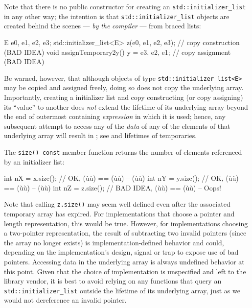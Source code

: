 \noindent Note that there is no public constructor for creating an
\lstinline!std::initializer_list! in any other way; the intention is that
\lstinline!std::initializer_list! objects are created behind the scenes
--- \emph{by} \emph{the} \emph{compiler} --- from braced lists:

\begin{emcppslisting}
E e0, e1, e2, e3;
std::initializer_list<E> z({e0, e1, e2, e3});   // copy construction (BAD IDEA)
void assignTemporary2y() { y = {e3, e2, e1}; }  // copy assignment (BAD IDEA)
\end{emcppslisting}
    

\noindent Be warned, however, that although objects of type
\lstinline!std::initializer_list<E>! may be copied and assigned freely,
doing so does not copy the underlying array. Importantly, creating a
 initializer list and copy constructing (or copy
assigning) its ``value'' to another does \emph{not} extend the lifetime
of its underlying array beyond the end of outermost containing
\emph{expression} in which it is used; hence, any subsequent attempt to
access any of the \emph{data} of any of the elements of that underlying
array will result in ; see
 and lifetimes of temporaries.

The \lstinline!size()!~\lstinline!const! member function returns the number of
elements referenced by an initializer list:

\begin{emcppslisting}
int nX = x.size();  // OK, (ù{}ù) == (ù{}ù) -- (ù{\codeincomments{\{ \}}}ù)
int nY = y.size();  // OK, (ù{}ù) == (ù{}ù) -- (ù{\codeincomments{\{ \}}}ù)
int nZ = z.size();  // BAD IDEA, (ù{}ù) == (ù{}ù) -- Oops!
\end{emcppslisting}
    

\noindent Note that calling \lstinline!z.size()! may seem well defined even after the
associated temporary array has expired. For implementations that choose
a pointer and length representation, this would be true. However, for
implementations choosing a two-pointer representation, the result of
subtracting two invalid pointers (since the array no longer exists) is
implementation-defined behavior and could, depending on the
implementation's design, signal or trap to expose use of bad pointers.
Accessing data in the underlying array is always undefined behavior at
this point. Given that the choice of implementation is unspecified and
left to the library vendor, it is best to avoid relying on any functions
that query an \lstinline!std::initializer_list! outside the lifetime of
its underlying array, just as we would not dereference an invalid
pointer.

